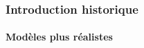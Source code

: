 \begin{frame}
    \frametitle{Introduction historique}
    \framesubtitle{Modèles plus réalistes}


\end{frame}
